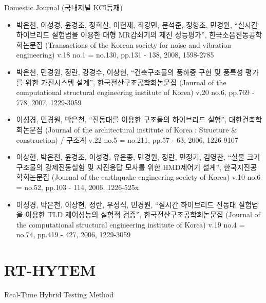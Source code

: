 \documentclass[usepdftitle=false]{beamer}
\newcommand\Fontvi{\fontsize{6}{7.2}\selectfont}
\begin{document}
\begin{frame}{Domestic Journal (국내저널 KCI등재)}
\Fontvi
\begin{itemize}
\item 박은천, 이성경, 윤경조, 정희산, 이헌재, 최강민, 문석준, 정형조, 민경원, “실시간 하이브리드 실험법을 이용한 대형 MR감쇠기의 제진 성능평가”, 한국소음진동공학회논문집 (Transactions of the Korean society for noise and vibration engineering) v.18 no.1 = no.130, pp.131 - 138, 2008, 1598-2785
\item 박은천, 민경원, 정란, 강경수, 이상현, “건축구조물의 풍하중 구현 및 풍특성 평가를 위한 가진시스템 설계”, 한국전산구조공학회논문집 (Journal of the computational structural engineering institute of Korea) v.20 no.6, pp.769 - 778, 2007, 1229-3059
\item 이성경, 민경원, 박은천, “진동대를 이용한 구조물의 하이브리드 실험”, 대한건축학회논문집 (Journal of the architectural institute of Korea : Structure \& construction) / 구조계 v.22 no.5 = no.211, pp.57 - 63, 2006, 1226-9107
\item 이상현, 박은천, 윤경조, 이성경, 유은종, 민경원, 정란, 민정기, 김영찬, “실물 크기 구조물의 강제진동실험 및 지진응답 모사를 위한 HMD제어기 설계”, 한국지진공학회논문집 (Journal of the earthquake engineering society of Korea) v.10 no.6 = no.52, pp.103 - 114, 2006, 1226-525x
\item 이성경, 박은천, 이상현, 정란, 우성식, 민경원, “실시간 하이브리드 진동대 실험법을 이용한 TLD 제어성능의 실험적 검증”, 한국전산구조공학회논문집 (Journal of the computational structural engineering institute of Korea) v.19 no.4 = no.74, pp.419 - 427, 2006, 1229-3059
\end{itemize}
\end{frame}



\section{RT-HYTEM}
\begin{frame}{Real-Time Hybrid Testing Method}
\begin{figure}[ht]
\centering
{}\hfill
{}
\end{figure}
\end{frame}
\end{document}
